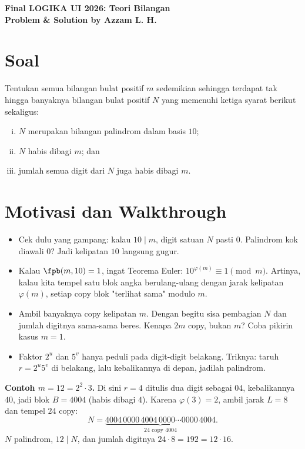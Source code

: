 \begin{center}
    {\color{crimson}\textbf{\Huge Final LOGIKA UI 2026: Teori Bilangan}}\\[4pt]
    {\color{inksoft}\textbf{\large Problem \& Solution by Azzam L. H.}}
\end{center}

\section{Soal}
Tentukan semua bilangan bulat positif $m$ sedemikian sehingga terdapat tak hingga banyaknya bilangan bulat positif $N$ yang memenuhi ketiga syarat berikut sekaligus:
\begin{enumerate}[(i)]
    \item $N$ merupakan bilangan palindrom dalam basis $10$;
    \item $N$ habis dibagi $m$; dan
    \item jumlah semua digit dari $N$ juga habis dibagi $m$.
\end{enumerate}

\newpage
\section{Motivasi dan Walkthrough}
    \begin{itemize}
        \item Cek dulu yang gampang: kalau $10 \mid m$, digit satuan $N$ pasti $0$. Palindrom kok diawali $0$? Jadi kelipatan $10$ langsung gugur.
        \item Kalau $\fpb(m, 10) = 1$, ingat Teorema Euler: $10^{\varphi(m)} \equiv 1 \pmod{m}$. Artinya, kalau kita tempel satu blok angka berulang-ulang dengan jarak kelipatan $\varphi(m)$, setiap copy blok "terlihat sama" modulo $m$.
        \item Ambil banyaknya copy kelipatan $m$. Dengan begitu sisa pembagian $N$ dan jumlah digitnya sama-sama beres. Kenapa $2m$ copy, bukan $m$? Coba pikirin kasus $m = 1$.
        \item Faktor $2^u$ dan $5^v$ hanya peduli pada digit-digit belakang. Triknya: taruh $r = 2^u 5^v$ di belakang, lalu kebalikannya di depan, jadilah palindrom.
    \end{itemize}

\textbf{Contoh $m = 12 = 2^2 \cdot 3$.} Di sini $r = 4$ ditulis dua digit sebagai $04$, kebalikannya $40$, jadi blok $B = 4004$ (habis dibagi $4$). Karena $\varphi(3) = 2$, ambil jarak $L = 8$ dan tempel $24$ copy:
\[
    N = \underbrace{4004\,0000\,4004\,0000 \cdots 0000\,4004}_{24 \text{ copy } 4004}.
\]
$N$ palindrom, $12 \mid N$, dan jumlah digitnya $24 \cdot 8 = 192 = 12 \cdot 16$.

